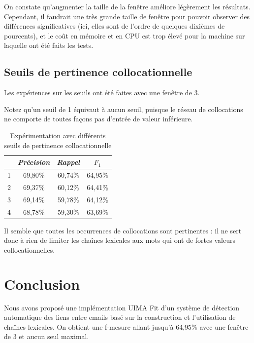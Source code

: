 \documentclass[a4paper]{article}
\begin{document}
\FloatBarrier

On constate qu'augmenter la taille de la fenêtre améliore légèrement les résultats. Cependant, il faudrait une très grande taille de fenêtre pour pouvoir observer des différences significatives (ici, elles sont de l'ordre de quelques dixièmes de pourcents), et le coût en mémoire et en CPU est trop élevé pour la machine sur laquelle ont été faits les tests.\newline

\subsection{Seuils de pertinence collocationnelle}

Les expériences sur les seuils ont été faites avec une fenêtre de 3.\newline

Notez qu'un seuil de 1 équivaut à aucun seuil, puisque le réseau de collocations ne comporte de toutes façons pas d'entrée de valeur inférieure.

\FloatBarrier

\begin{table}[h]
	\centering
	\begin{tabular}{l|c|c|c|}
	\cline{2-4}
		                    & \textit{Précision} & \textit{Rappel} & \textit{$F_1$} \\ \hline
	\multicolumn{1}{|l|}{1} & 69,80\% & 60,74\% & 64,95\% \\ \hline
	\multicolumn{1}{|l|}{2} & 69,37\% & 60,12\% & 64,41\% \\ \hline
	\multicolumn{1}{|l|}{3} & 69,14\% & 59,78\% & 64,12\% \\ \hline
	\multicolumn{1}{|l|}{4} & 68,78\% & 59,30\% & 63,69\% \\ \hline
	\end{tabular}
	\caption{Expérimentation avec différents seuils de pertinence collocationnelle}
\end{table}

\FloatBarrier

Il semble que toutes les occurrences de collocations sont pertinentes : il ne sert donc à rien de limiter les chaînes lexicales aux mots qui ont de fortes valeurs collocationnelles.

\section{Conclusion}

Nous avons proposé une implémentation UIMA Fit d'un système de détection automatique des liens entre emails basé sur la construction et l'utilisation de chaînes lexicales. On obtient une f-mesure allant jusqu'à 64,95\% avec une fenêtre de 3 et aucun seul maximal.
\end{document}
